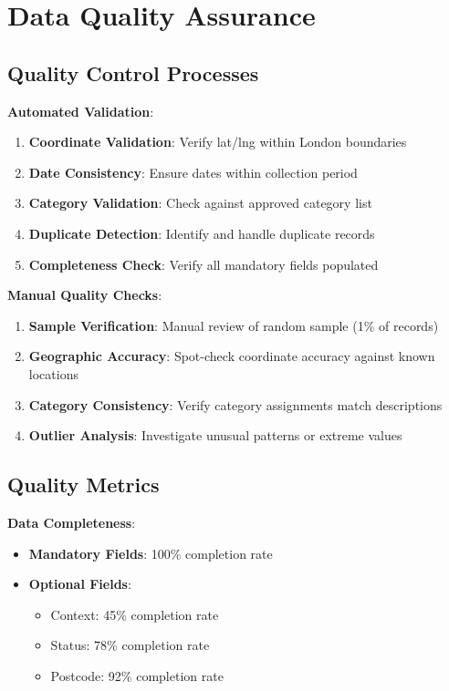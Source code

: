 \documentclass[12pt,a4paper]{article}
\begin{document}
\section{Data Quality Assurance}

\subsection{Quality Control Processes}

\textbf{Automated Validation}:
\begin{enumerate}
    \item \textbf{Coordinate Validation}: Verify lat/lng within London boundaries
    \item \textbf{Date Consistency}: Ensure dates within collection period
    \item \textbf{Category Validation}: Check against approved category list
    \item \textbf{Duplicate Detection}: Identify and handle duplicate records
    \item \textbf{Completeness Check}: Verify all mandatory fields populated
\end{enumerate}

\textbf{Manual Quality Checks}:
\begin{enumerate}
    \item \textbf{Sample Verification}: Manual review of random sample (1\% of records)
    \item \textbf{Geographic Accuracy}: Spot-check coordinate accuracy against known locations
    \item \textbf{Category Consistency}: Verify category assignments match descriptions
    \item \textbf{Outlier Analysis}: Investigate unusual patterns or extreme values
\end{enumerate}

\subsection{Quality Metrics}

\textbf{Data Completeness}:
\begin{itemize}
    \item \textbf{Mandatory Fields}: 100\% completion rate
    \item \textbf{Optional Fields}: 
    \begin{itemize}
        \item Context: 45\% completion rate
        \item Status: 78\% completion rate
        \item Postcode: 92\% completion rate
    \end{itemize}
\end{itemize}
\end{document}
